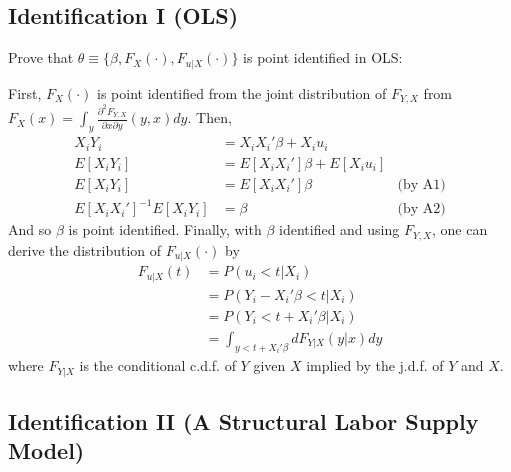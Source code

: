 \documentclass[11pt]{article}
\begin{document}
\begin{center}
\end{center}

\subsection*{Identification I (OLS)}

Prove that $\theta \equiv \{ \beta, F_X(\cdot), F_{u|X}(\cdot) \}$ is point identified in OLS:

First, $F_X(\cdot)$ is point identified from the joint distribution of $F_{Y,X}$ from $F_X(x) = \int_{y} \frac{\partial^2 F_{Y,X}}{\partial x \partial y}(y,x) dy$. Then,
\begin{align*}
	X_i Y_i &= X_i X_i' \beta + X_i u_i \\
	E[X_i Y_i] &= E[X_i X_i'] \beta + E[X_i u_i] \\
	E[X_i Y_i] &= E[X_i X_i'] \beta &\mbox{(by A1)} \\
	E[X_i X_i']^{-1} E[X_i Y_i] &= \beta &\mbox{(by A2)}
\end{align*}
And so $\beta$ is point identified. Finally, with $\beta$ identified and using $F_{Y,X}$, one can derive the distribution of $F_{u|X}(\cdot)$ by
\begin{align*}
	F_{u|X}(t) &= P(u_i < t | X_i) \\
	&= P(Y_i - X_i'\beta < t | X_i) \\
	&= P(Y_i < t + X_i'\beta | X_i) \\
	&= \int_{y < t + X_i'\beta} dF_{Y|X}(y|x) dy
\end{align*}
where $F_{Y|X}$ is the conditional c.d.f. of $Y$ given $X$ implied by the j.d.f. of $Y$ and $X$.

\subsection*{Identification II (A Structural Labor Supply Model)}
\end{document}
